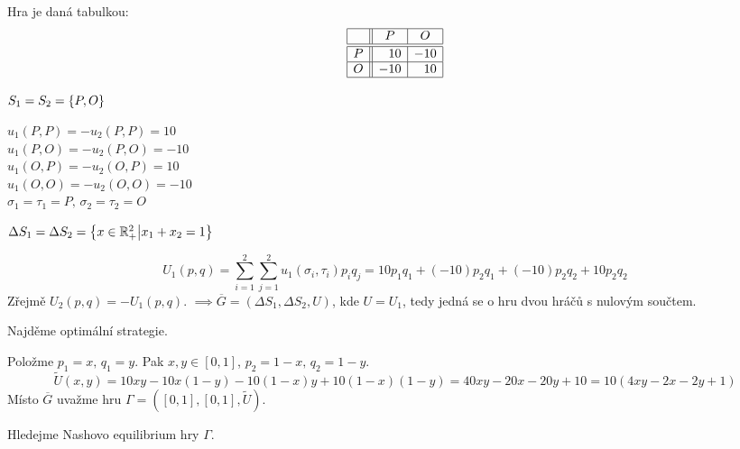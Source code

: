 \begin{multicols}{2}
    Hra je daná tabulkou:
    \[
    \begin{array}{|c| |c|c|}
        \hline
        & P & O \\ \hline \hline
        P & \phantom{-}10 & -10 \\ \hline
        O & -10 & \phantom{-}10 \\ \hline
    \end{array}
    \]

    $S_1 = S_2 = \left\lbrace P, O \right\rbrace$

    $u_1 (P, P) = - u_2(P,P) = 10$\\
    $u_1 (P, O) = - u_2(P,O) = -10$\\
    $u_1 (O, P) = - u_2(O,P) = 10$\\
    $u_1 (O, O) = - u_2(O,O) = -10$\\
    $\sigma_1 = \tau_1 = P,\, \sigma_2 = \tau_2 = O$

\end{multicols}
$\Delta S_1 = \Delta S_2 = \left\lbrace x \in \mathbb{R}_+^2 \middle| x_1 + x_2 = 1 \right\rbrace$

\[  
    U_1(p,q) = \sum_{i=1}^{2} \sum_{j=1}^{2} u_1 (\sigma_i, \tau_i)p_i q_j = 
    10p_1q_1 + (-10)p_2q_1 + (-10)p_2q_2 + 10p_2q_2
\]
Zřejmě $U_2(p,q) = -U_1(p,q)$. $\implies \overline{G} = (\Delta S_1, \Delta S_2, U)$, kde $U = U_1$, tedy jedná se o hru
dvou hráčů s nulovým součtem.

Najděme optimální strategie.

Položme $p_1 = x,\, q_1 = y$. Pak $x, y \in [0,1]$, $p_2 = 1-x, \, q_2 = 1-y$.
\[
    \widetilde{U}(x,y) = 10xy - 10x(1-y) - 10(1-x)y + 10(1-x)(1-y) = 40xy -20x - 20y + 10 = 10(4xy - 2x - 2y + 1)
\]
Místo $\overline{G}$ uvažme hru $\Gamma = \left([0,1], [0,1], \widetilde{U}\right)$.

Hledejme Nashovo equilibrium hry $\Gamma$.

